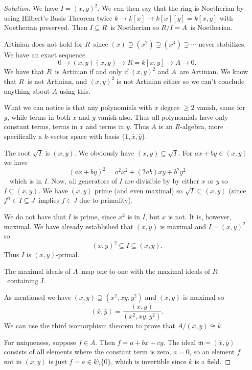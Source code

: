 \documentclass[11pt]{article}
\begin{document}
\begin{proof}[Solution]
    We have $I = (x,y)^2$. We can then say that 
    the ring is Noetherian by using Hilbert's 
    Basis Theorem twice $k \rightarrow k[x] 
    \rightarrow k[x][y] = k[x,y]$ with Noetherian 
    preserved. Then $I \subseteq R$ is 
    Noetherian so $R/I = A$ is Noetherian. 

    Artinian does not hold for $R$ since 
    $(x) \supsetneq (x^2) \supsetneq (x^4) \supsetneq \cdots$ never 
    stabilizes. We have an exact sequence 
    \[
        0 \to (x,y)(x,y) \to R = k[x,y] \to A \to 0.  
    \]
    We have that $R$ is Artinian if 
    and only if $(x,y)^2$ and $A$ are Artinian. 
    We know that $R$ is not Artinian, and 
    $(x,y)^2$ is not Artinian either so we 
    can't conclude anything about $A$ using this. 

    What we can notice is that 
    any polynomials with $x$ degree 
    $\geq 2$ vanish, same for $y$, while 
    terms in both $x$ and $y$ vanish also. Thus 
    all polynomials have only constant terms, terms in $x$ and 
    terms in $y$. 
    Thus $A$ is an $R$-algebra, more specifically a 
    $k$-vector space with basis $\{1,\bar x,\bar y\}$.

    The root $\sqrt I$ is $(x,y)$. 
    We obviously have $(x,y) \subseteq \sqrt I$. 
    For $ax + by \in (x,y)$ we have 
    \[
        (ax + by)^2 = a^2x^2 + (2ab)xy + b^2y^2  
    \] 
    which is in $I$. 
    Now, all generators of $I$ are divisible by by either 
    $x$ or $y$ so $I \subseteq (x,y)$. We have $(x,y)$ prime 
    (and even maximal) so $\sqrt I \subseteq (x,y)$ (since 
    $f^n \in I \subseteq J$ implies $f \in J$ due to 
    primality).

    We do not have that $I$ is prime, since 
    $x^2$ is in $I$, but $x$ is not. It is, however, 
    maximal. We have already established that 
    $(x,y)$ is maximal and $I = (x,y)^2$ so 
    \[
        (x,y)^2 \subseteq I \subseteq (x,y). 
    \]
    Thus $I$ is $(x,y)$-primal. 

    The maximal ideals of $A$ map one to one with the 
    maximal ideals of $R$ containing $I$. 

    As mentioned we have $(x,y) \supseteq (x^2,xy,y^2)$ and 
    $(x,y)$ is maximal so 
    \[
        (\bar x, \bar y) = \frac{(x,y)}{(x^2,xy,y^2)}. 
    \]
    We can use the third isomorphism theorem 
    to prove that $A/(\bar x, \bar y) \cong k$. 

    For uniqueness, 
    suppose $f \in A$. 
    Then $f = a + bx + cy$. 
    The ideal $\mathfrak m = (\bar x,\bar y)$ 
    consists of all elements 
    where the constant term is zero, $a = 0$, 
    so an element $f$ not in 
    $(\bar x,\bar y)$ is just $f = a \in k \setminus \{0\}$, 
    which is 
    invertible since $k$ is a field. 


\end{proof}
\end{document}
